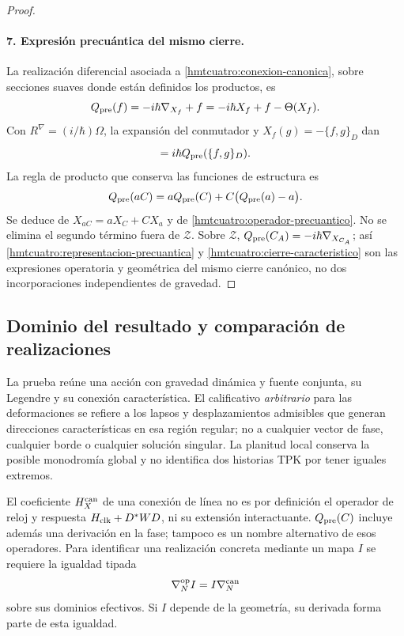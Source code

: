 \begin{proof}
\paragraph{7. Expresión precuántica del mismo cierre.}
La realización diferencial asociada a
\eqref{hmtcuatro:conexion-canonica}, sobre secciones suaves donde
están definidos los productos, es
\begin{equation}
 Q_{\rm pre}(f)=-i\hbar\nabla_{X_f}+f
            =-i\hbar X_f+f-\Theta(X_f).
 \label{hmtcuatro:operador-precuantico}
\end{equation}
Con \(R^\nabla=(i/\hbar)\Omega\), la expansión del conmutador y
\(X_f(g)=-\{f,g\}_D\) dan
\begin{equation}
 [Q_{\rm pre}(f),Q_{\rm pre}(g)]
           =i\hbar Q_{\rm pre}(\{f,g\}_D).
 \label{hmtcuatro:representacion-precuantica}
\end{equation}
La regla de producto que conserva las funciones de estructura es
\begin{equation}
 Q_{\rm pre}(aC)
   =aQ_{\rm pre}(C)+C\bigl(Q_{\rm pre}(a)-a\bigr).
 \label{hmtcuatro:funciones-estructura}
\end{equation}
Se deduce de \(X_{aC}=aX_C+CX_a\) y de
\eqref{hmtcuatro:operador-precuantico}. No se elimina el segundo
término fuera de \(\mathcal Z\).
Sobre \(\mathcal Z\), \(Q_{\rm pre}(C_A)=-i\hbar\nabla_{X_{C_A}}\);
así \eqref{hmtcuatro:representacion-precuantica} y
\eqref{hmtcuatro:cierre-caracteristico} son las expresiones operatoria
y geométrica del mismo cierre canónico, no dos incorporaciones
independientes de gravedad.
\end{proof}

\subsection{Dominio del resultado y comparación de realizaciones}
\label{hmtcuatro:alcance-canonico}

La prueba reúne una acción con gravedad dinámica y fuente conjunta,
su Legendre y su conexión característica. El calificativo
\emph{arbitrario} para las deformaciones se refiere a los lapsos y
desplazamientos admisibles que generan direcciones características en
esa región regular; no a cualquier vector de fase, cualquier borde
o cualquier solución singular. La planitud local conserva la posible
monodromía global y no identifica dos historias TPK por tener iguales
extremos.

El coeficiente \(H_X^{\rm can}\) de una conexión de línea no es por
definición el operador de reloj y respuesta \(H_{\rm clk}+D^*WD\),
ni su extensión interactuante. \(Q_{\rm pre}(C)\) incluye además
una derivación en la fase; tampoco es un nombre alternativo de esos
operadores. Para identificar una realización concreta mediante un
mapa \(I\) se requiere la igualdad tipada
\[
 \nabla_N^{\rm op}I=I\nabla_N^{\rm can}
\]
sobre sus dominios efectivos. Si \(I\) depende de la geometría, su
derivada forma parte de esta igualdad.

